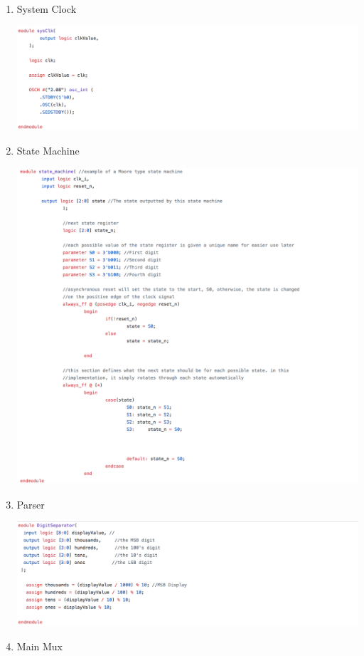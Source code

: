 \documentclass[a4paper]{article}
\begin{document}
\begin{enumerate}
\item System Clock

\includegraphics[width=6 in]{./Images/Archive/13-SystemClock.png}

\item State Machine

\includegraphics[width=6 in]{./Images/Archive/14-StateMachine.png}

\item Parser

\includegraphics[width=6 in]{./Images/Archive/15-Parser.png}

\item Main Mux


\end{enumerate}
\end{document}
